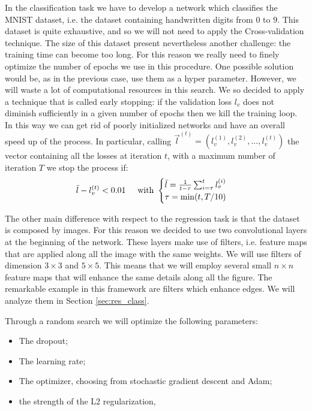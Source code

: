 In the classification task we have to develop a network which classifies the MNIST dataset, i.e. the dataset containing handwritten
digits from $0$ to $9$. This dataset is quite exhaustive, and so we will not need to apply the Cross-validation technique.
The size of this dataset present nevertheless another challenge: the training time can become too long. For this reason we really
need to finely optimize the number of epochs we use in this procedure. One possible solution would be, as in the previous case,
use them as a hyper parameter. However, we will waste a lot of computational resources in this search. We so decided to apply
a technique that is called early stopping: if the validation loss $l_{v}$ does not diminish sufficiently in a given number of
epochs then we kill the training loop. In this way we can get rid of poorly initialized networks and have an overall speed up
of the process. In particular, calling $\vec{l}^{(t)}=(l_{v}^{(1)},l_{v}^{(2)}, \dots, l_{v}^{(t)} )$ the vector containing all the losses at iteration $t$, with a maximum number
of iteration $T$ we stop the process if:
\begin{equation}
    \bar{l} - l_v^{(t)} < 0.01 \hspace{0.5 cm} \mbox{with } \begin{cases}\bar{l}= \frac{1}{t-\tau}\sum_{i=\tau}^t l_v^{(i)} \\ \tau=\min(t, T/10)
    \end{cases}
\end{equation}

The other main difference with respect to the regression task is that the dataset is composed by images. For this reason we 
decided to use two convolutional layers at the beginning of the network. These layers make use of filters, i.e. feature maps
that are applied along all the image with the same weights. We will use filters of dimension $3\times3$ and $5\times 5$. This means that we
will employ several small $n\times n$ feature maps that will enhance the same details along all the figure. The remarkable example 
in this framework are filters which enhance edges. We will analyze them in Section \ref{sec:res_class}.

Through a random search we will optimize the following parameters:
\begin{itemize}
    \item The dropout;
    \item The learning rate;
    \item The optimizer, choosing from stochastic gradient descent and Adam;
    \item the strength of the L2 regularization,
\end{itemize}

